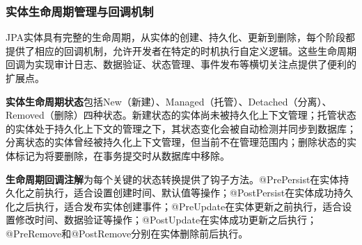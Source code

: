 \subsubsection{实体生命周期管理与回调机制}\label{ux5b9eux4f53ux751fux547dux5468ux671fux7ba1ux7406ux4e0eux56deux8c03ux673aux5236}

JPA实体具有完整的生命周期，从实体的创建、持久化、更新到删除，每个阶段都提供了相应的回调机制，允许开发者在特定的时机执行自定义逻辑。这些生命周期回调为实现审计日志、数据验证、状态管理、事件发布等横切关注点提供了便利的扩展点。

\textbf{实体生命周期状态}包括New（新建）、Managed（托管）、Detached（分离）、Removed（删除）四种状态。新建状态的实体尚未被持久化上下文管理；托管状态的实体处于持久化上下文的管理之下，其状态变化会被自动检测并同步到数据库；分离状态的实体曾经被持久化上下文管理，但当前不在管理范围内；删除状态的实体标记为将要删除，在事务提交时从数据库中移除。

\textbf{生命周期回调注解}为每个关键的状态转换提供了钩子方法。@PrePersist在实体持久化之前执行，适合设置创建时间、默认值等操作；@PostPersist在实体成功持久化之后执行，适合发布实体创建事件；@PreUpdate在实体更新之前执行，适合设置修改时间、数据验证等操作；@PostUpdate在实体成功更新之后执行；@PreRemove和@PostRemove分别在实体删除前后执行。

